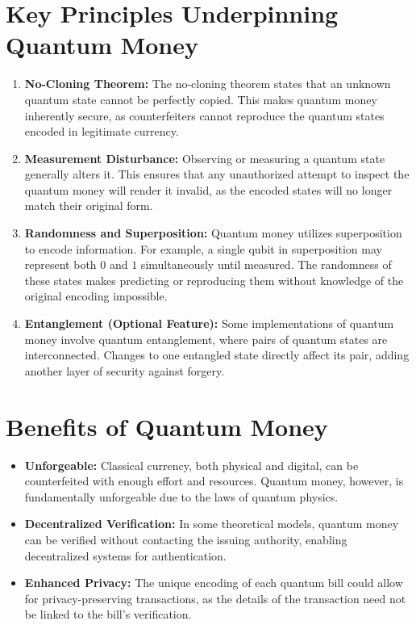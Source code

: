 \documentclass[11pt]{article}
\theoremstyle{definition}
\begin{document}
\section*{Key Principles Underpinning Quantum Money}
\begin{enumerate}
    \item \textbf{No-Cloning Theorem:} The no-cloning theorem states that an unknown quantum state cannot be perfectly copied. This makes quantum money inherently secure, as counterfeiters cannot reproduce the quantum states encoded in legitimate currency.
    \item \textbf{Measurement Disturbance:} Observing or measuring a quantum state generally alters it. This ensures that any unauthorized attempt to inspect the quantum money will render it invalid, as the encoded states will no longer match their original form.
    \item \textbf{Randomness and Superposition:} Quantum money utilizes superposition to encode information. For example, a single qubit in superposition may represent both $0$ and $1$ simultaneously until measured. The randomness of these states makes predicting or reproducing them without knowledge of the original encoding impossible.
    \item \textbf{Entanglement (Optional Feature):} Some implementations of quantum money involve quantum entanglement, where pairs of quantum states are interconnected. Changes to one entangled state directly affect its pair, adding another layer of security against forgery.
\end{enumerate}


\section*{Benefits of Quantum Money}
\begin{itemize}
    \item \textbf{Unforgeable:} Classical currency, both physical and digital, can be counterfeited with enough effort and resources. Quantum money, however, is fundamentally unforgeable due to the laws of quantum physics.
    \item \textbf{Decentralized Verification:} In some theoretical models, quantum money can be verified without contacting the issuing authority, enabling decentralized systems for authentication.
    \item \textbf{Enhanced Privacy:} The unique encoding of each quantum bill could allow for privacy-preserving transactions, as the details of the transaction need not be linked to the bill's verification.
\end{itemize}
\end{document}
